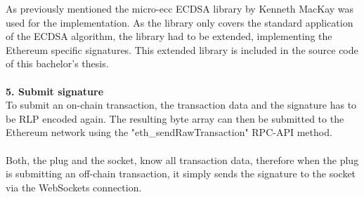 As previously mentioned the micro-ecc ECDSA library by Kenneth MacKay was used for the implementation. As the library only covers the standard application of the ECDSA algorithm, the library had to be extended, implementing the Ethereum specific signatures. This extended library is included in the source code of this bachelor’s thesis.
\\\\
\textbf{5. Submit signature}\\
To submit an on-chain transaction, the transaction data and the signature has to be RLP encoded again. The resulting byte array can then be submitted to the Ethereum network using the "eth\_sendRawTransaction" RPC-API method.
\\\\
Both, the plug and the socket, know all transaction data, therefore when the plug is submitting an off-chain transaction, it simply sends the signature to the socket via the WebSockets connection.
\newpage

